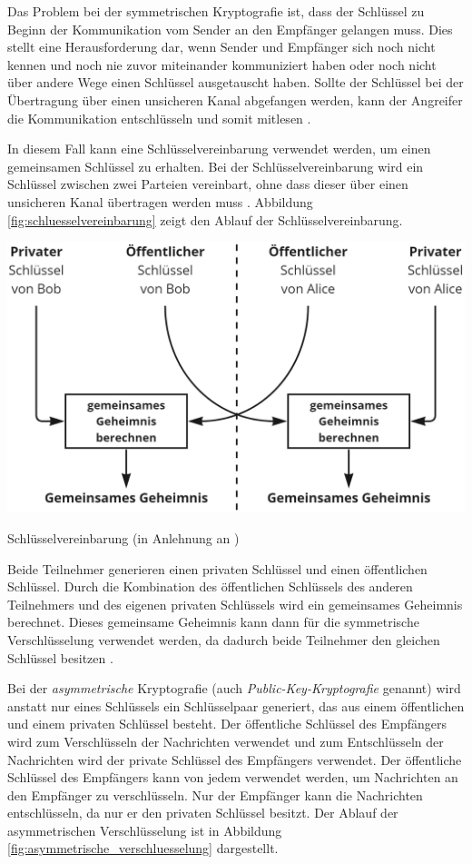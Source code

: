 \noindent Das Problem bei der symmetrischen Kryptografie ist, dass der Schlüssel zu Beginn der Kommunikation vom Sender an den Empfänger gelangen muss. Dies stellt eine Herausforderung dar, wenn Sender und Empfänger sich noch nicht kennen und noch nie zuvor miteinander kommuniziert haben oder noch nicht über andere Wege einen Schlüssel ausgetauscht haben. Sollte der Schlüssel bei der Übertragung über einen unsicheren Kanal abgefangen werden, kann der Angreifer die Kommunikation entschlüsseln und somit mitlesen \Parencites[S. 644]{DiffieHellman_NewDirectionsInCryptography}[S. 5-8]{Wong_KryptoPraxis}. 

In diesem Fall kann eine Schlüsselvereinbarung verwendet werden, um einen gemeinsamen Schlüssel zu erhalten. Bei der Schlüsselvereinbarung wird ein Schlüssel zwischen zwei Parteien vereinbart, ohne dass dieser über einen unsicheren Kanal übertragen werden muss \Parencite[S. 102]{Wong_KryptoPraxis}. Abbildung \ref{fig:schluesselvereinbarung} zeigt den Ablauf der Schlüsselvereinbarung.

\begin{center}
    \captionsetup{type=figure}
    \includegraphics[width=0.7\linewidth]{images/key_exchange.png}
    \caption{Schlüsselvereinbarung (in Anlehnung an \cite[S. 102]{Wong_KryptoPraxis})}
    \label{fig:schluesselvereinbarung}
\end{center}

\noindent Beide Teilnehmer generieren einen privaten Schlüssel und einen öffentlichen Schlüssel. Durch die Kombination des öffentlichen Schlüssels des anderen Teilnehmers und des eigenen privaten Schlüssels wird ein gemeinsames Geheimnis berechnet. Dieses gemeinsame Geheimnis kann dann für die symmetrische Verschlüsselung verwendet werden, da dadurch beide Teilnehmer den gleichen Schlüssel besitzen \Parencite[S. 102]{Wong_KryptoPraxis}.


Bei der \textit{asymmetrische} Kryptografie (auch \textit{Public-Key-Kryptografie} genannt) wird anstatt nur eines Schlüssels ein Schlüsselpaar generiert, das aus einem öffentlichen und einem privaten Schlüssel besteht. Der öffentliche Schlüssel des Empfängers wird zum Verschlüsseln der Nachrichten verwendet und zum Entschlüsseln der Nachrichten wird der private Schlüssel des Empfängers verwendet. Der öffentliche Schlüssel des Empfängers kann von jedem verwendet werden, um Nachrichten an den Empfänger zu verschlüsseln. Nur der Empfänger kann die Nachrichten entschlüsseln, da nur er den privaten Schlüssel besitzt. Der Ablauf der asymmetrischen Verschlüsselung ist in Abbildung \ref{fig:asymmetrische_verschluesselung} dargestellt.


